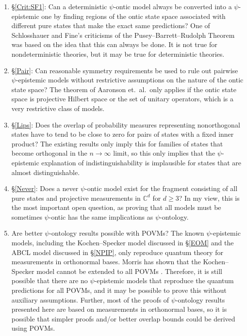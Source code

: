 \documentclass[DIV=calc,fontsize=12pt]{scrartcl} %
\theoremstyle{definition}
\theoremstyle{plain}
\begin{document}
\begin{enumerate}
\item \S\ref{Crit:SF1}: Can a deterministic $\psi$-ontic model always
be converted into a $\psi$-epistemic one by finding regions of the
ontic state space associated with different pure states that make
the exact same predictions?  One of Schlosshauer and Fine's
criticisms of the Pusey--Barrett--Rudolph Theorem was based on the idea that this can
always be done.  It is not true for nondeterministic theories, but
it may be true for deterministic theories.
\item \S\ref{Pair}: Can reasonable symmetry requirements be used to
rule out pairwise $\psi$-epistemic models without restrictive
assumptions on the nature of the ontic state space?  The theorem of
Aaronson et.\ al.\ only applies if the ontic state space is
projective Hilbert space or the set of unitary operators, which is a
very restrictive class of models.
\item \S\ref{Lips}: Does the overlap of probability measures
representing nonorthogonal states have to tend to be close to zero
for pairs of states with a fixed inner product?  The existing
results only imply this for families of states that become
orthogonal in the $n \rightarrow \infty$ limit, so this only implies
that the $\psi$-epistemic explanation of indistinguishability is
implausible for states that are almost distinguishable.
\item \S\ref{Never}: Does a never $\psi$-ontic model exist for the
fragment consisting of all pure states and projective measurements
in $\mathbb{C}^d$ for $d \geq 3$?  In my view, this is the most
important open question, as proving that all models must be
sometimes $\psi$-ontic has the same implications as $\psi$-ontology.
\item Are better $\psi$-ontology results possible with POVMs?  The
known $\psi$-epistemic models, including the Kochen--Specker model
discussed in \S\ref{EOM} and the ABCL model discussed in
\S\ref{NPIP}, only reproduce quantum theory for measurements in
orthonormal bases.  Morris has shown that the Kochen--Specker model
cannot be extended to all POVMs \cite{Morris2009}.  Therefore, it
is still possible that there are no $\psi$-epistemic models that
reproduce the quantum predictions for all POVMs, and it may be
possible to prove this without auxiliary assumptions.  Further, most
of the proofs of $\psi$-ontology results presented here are based on
measurements in orthonormal bases, so it is possible that simpler
proofs and/or better overlap bounds could be derived using POVMs.

\end{enumerate}
\end{document}
